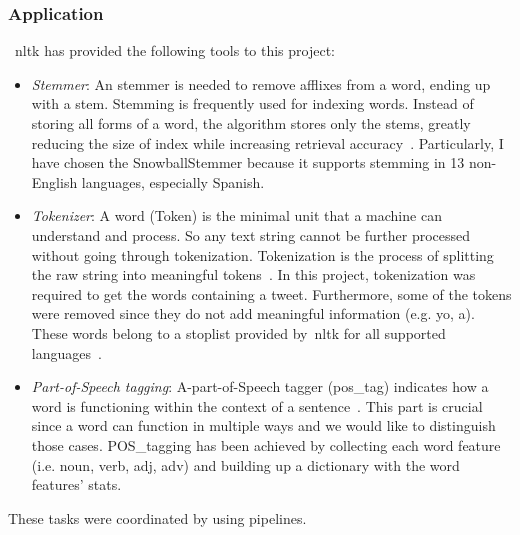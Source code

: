 \subsubsection{Application}
~\ac{nltk} has provided the following tools to this project:
\begin{itemize}
	\item \textit{Stemmer}: An stemmer is needed to remove afflixes from a word, ending up with a stem. Stemming is frequently used for indexing words. Instead of storing all forms of a word, the algorithm stores only the stems, greatly reducing the size of index while increasing retrieval accuracy~\cite{nltk}. Particularly, I have chosen the SnowballStemmer because it supports stemming in 13 non-English languages, especially Spanish.
	\item \textit{Tokenizer}: A word (Token) is the minimal unit that a machine can understand and process. So any text string cannot be further processed without going through tokenization. Tokenization is the process of splitting the raw string into meaningful tokens~\cite{nltk}. In this project, tokenization was required to get the words containing a tweet. Furthermore, some of the tokens were removed since they do not add meaningful information (e.g. yo, a). These words belong to a stoplist provided by~\ac{nltk} for all supported languages~\cite{nltk}.
	\item \textit{Part-of-Speech tagging}:  A-part-of-Speech tagger (pos\_tag) indicates how a word is functioning within the context of a sentence~\cite{pos}. This part is crucial since a word can function in multiple ways and we would like to distinguish those cases. POS\_tagging has been achieved by collecting each word feature (i.e. noun, verb, adj, adv) and building up a dictionary with the word features' stats.
\end{itemize}

These tasks were coordinated by using pipelines. 

